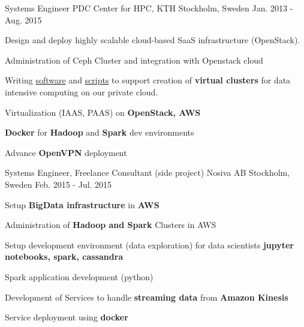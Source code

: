 \begin{cventries}

\cventry
{Systems Engineer} %
{PDC Center for HPC, KTH} %
{Stockholm, Sweden} %
{Jan. 2013 - Aug. 2015} %
{ %
\begin{cvitems}
\item Design and deploy highly scalable cloud-based SaaS infrastructure (OpenStack).
\item Administration of Ceph Cluster and integration with Openstack cloud
\item Writing \href{https://github.com/ezhaar/spark-openstack}{software} and \href{https://github.com/ezhaar/spark-installer}{scripts} to support creation of \textbf{virtual clusters} for data intensive computing on our private cloud. 
\item Virtualization (IAAS, PAAS) on \textbf{OpenStack, AWS}
\item \textbf{Docker} for \textbf{Hadoop} and \textbf{Spark} dev environments
\item Advance \textbf{OpenVPN} deployment
\end{cvitems}
}


\cventry
{Systems Engineer, Freelance Consultant (side project)} %
{Nosiva AB} %
{Stockholm, Sweden} %
{Feb. 2015 - Jul. 2015} %
{ %
\begin{cvitems}
\item Setup \textbf{BigData infrastructure} in \textbf{AWS}
\item Administration of \textbf{Hadoop and Spark} Clusters in AWS 
\item Setup development environment (data exploration) for data scientists \textbf{jupyter notebooks, spark, cassandra}
\item Spark application development (python)
\item Development of Services to handle \textbf{streaming data} from \textbf{Amazon Kinesis}
\item Service deployment using \textbf{docker} 
\end{cvitems}
}



\end{cventries}
